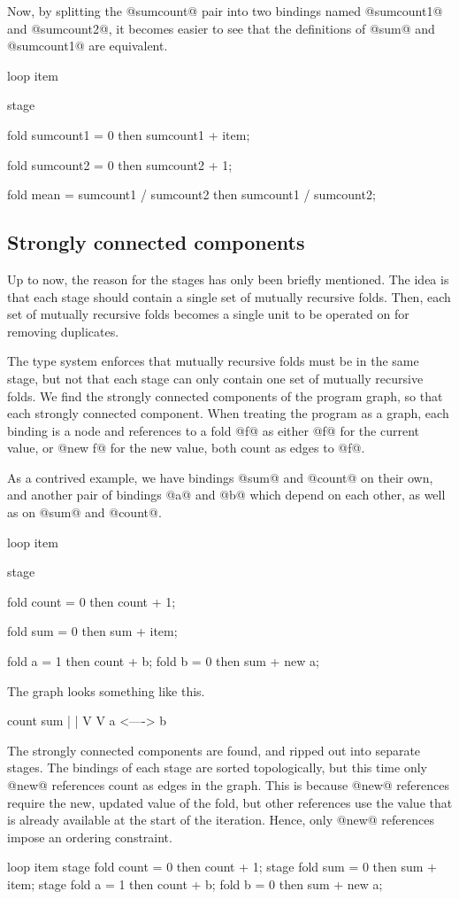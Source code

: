 Now, by splitting the @sumcount@ pair into two bindings named @sumcount1@ and @sumcount2@, it becomes easier to see that the definitions of @sum@ and @sumcount1@ are equivalent.
\begin{code}
loop item {
  stage {
    fold sumcount1
     = 0
     then
       sumcount1 + item;

    fold sumcount2
     = 0
     then
       sumcount2 + 1;

    fold mean
     = sumcount1 / sumcount2
     then
       sumcount1 / sumcount2;
  }
}
\end{code}



\subsection{Strongly connected components}
Up to now, the reason for the stages has only been briefly mentioned.
The idea is that each stage should contain a single set of mutually recursive folds.
Then, each set of mutually recursive folds becomes a single unit to be operated on for removing duplicates.

The type system enforces that mutually recursive folds must be in the same stage, but not that each stage can only contain one set of mutually recursive folds.
We find the strongly connected components of the program graph, so that each strongly connected component.
When treating the program as a graph, each binding is a node and references to a fold @f@ as either @f@ for the current value, or @new f@ for the new value, both count as edges to @f@.

As a contrived example, we have bindings @sum@ and @count@ on their own, and another pair of bindings @a@ and @b@ which depend on each other, as well as on @sum@ and @count@.
\begin{code}
loop item {
  stage {
    fold count = 0 then count + 1;

    fold sum   = 0 then sum   + item;

    fold a     = 1 then count + b;
    fold b     = 0 then sum + new a;
  }
}
\end{code}

The graph looks something like this.
\begin{code}
  count     sum
    |        |
    V        V
    a <----> b
\end{code}

The strongly connected components are found, and ripped out into separate stages.
The bindings of each stage are sorted topologically, but this time only @new@ references count as edges in the graph.
This is because @new@ references require the new, updated value of the fold, but other references use the value that is already available at the start of the iteration.
Hence, only @new@ references impose an ordering constraint.
\begin{code}
loop item {
  stage {
    fold count = 0 then count + 1;
  }
  stage {
    fold sum   = 0 then sum   + item;
  }
  stage {
    fold a     = 1 then count + b;
    fold b     = 0 then sum + new a;
  }
}
\end{code}

